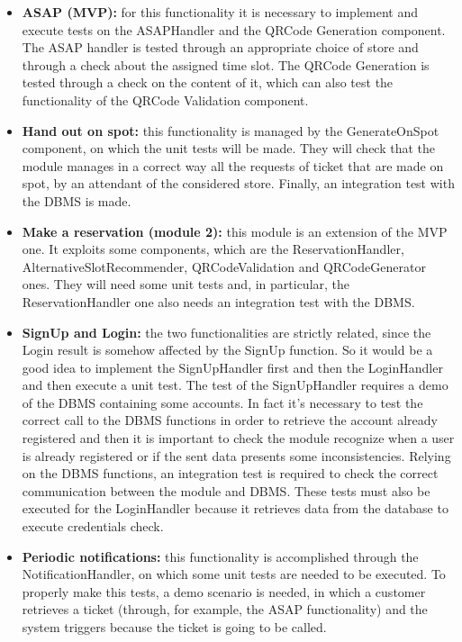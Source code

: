 \documentclass[table, 12pt]{article}
\begin{document}
\begin{itemize}
    \item \textbf{ASAP (MVP):} for this functionality it is necessary to implement and execute tests on the ASAPHandler and the QRCode Generation component. The ASAP handler is tested through an appropriate choice of store and through a check about the assigned time slot. The QRCode Generation is tested through a check on the content of it, which can also test the functionality of the QRCode Validation component.
    \item \textbf{Hand out on spot:} this functionality is managed by the GenerateOnSpot component, on which the unit tests will be made. They will check that the module manages in a correct way all the requests of ticket that are made on spot, by an attendant of the considered store. Finally, an integration test with the DBMS is made.
    \item \textbf{Make a reservation (module 2):} this module is an extension of the MVP one. It exploits some components, which are the ReservationHandler, AlternativeSlotRecommender, QRCodeValidation and QRCodeGenerator ones. They will need some unit tests and, in particular, the ReservationHandler one also needs an integration test with the DBMS.
    \item \textbf{SignUp and Login:} the two functionalities are strictly related, since the Login result is somehow affected by the SignUp function. So it would be a good idea to implement the SignUpHandler first and then the LoginHandler and then execute a unit test. The test of the SignUpHandler requires a demo of the DBMS containing some accounts. In fact it’s necessary to test the correct call to the DBMS functions in order to retrieve the account already registered and then it is important to check the module recognize when a user is already registered or if the sent data presents some inconsistencies. Relying on the DBMS functions, an integration test is required to check the correct communication between the module and DBMS. These tests must also be executed for the LoginHandler because it retrieves data from the database to execute credentials check.
    \item \textbf{Periodic notifications:} this functionality is accomplished through the NotificationHandler, on which some unit tests are needed to be executed. To properly make this tests, a demo scenario is needed, in which a customer retrieves a ticket (through, for example, the ASAP functionality) and the system triggers because the ticket is going to be called.
\end{itemize}
\end{document}
